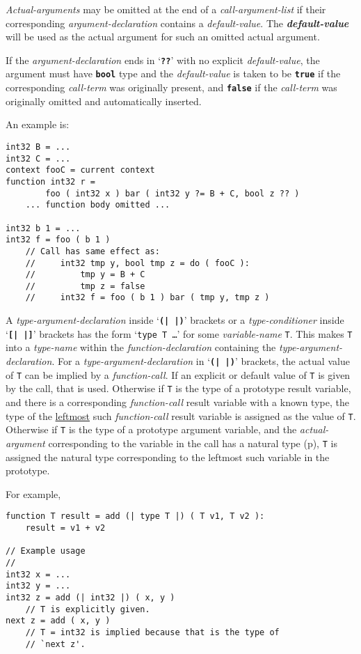 \documentclass[12pt]{article}
\makeatletter
\newcommand{\TT}[1]{{\tt \bfseries #1}}
\newcommand{\emkey}[1]{{\bf \em #1}\index{#1@{\em #1}}}
\newcommand{\pagref}[1]{p\pageref{#1}}
\newenvironment{indpar}[1][0.3in]%
	{\begin{list}{}%
		     {\setlength{\itemsep}{0in}%
		      \setlength{\topsep}{0in}%
		      \setlength{\parsep}{1ex}%
		      \setlength{\labelwidth}{#1}%
		      \setlength{\leftmargin}{#1}%
		      \addtolength{\leftmargin}{\labelsep}}%
	 \item}%
	{\end{list}}
\makeatother
\begin{document}
{\em Actual-arguments} may be omitted at the end of a {\em call-argument-list}
if their corresponding
{\em argu\-ment-declaration} contains a {\em default-value}.
\label{DEFAULT-VALUE}
The \emkey{default-value} will be used as the actual argument
for such an omitted actual argument.

If the {\em argument-declaration} ends in `\TT{??}'\label{BOOL-DEFAULT}
with no explicit {\em default-value}, the
argument must have \TT{bool} type and the
{\em default-value} is taken to be \TT{true} if the
corresponding {\em call-term} was originally present, and \TT{false} if the
{\em call-term} was originally omitted and automatically inserted.

An example is:
\begin{indpar}\begin{verbatim}
int32 B = ...
int32 C = ...
context fooC = current context
function int32 r =
        foo ( int32 x ) bar ( int32 y ?= B + C, bool z ?? )
    ... function body omitted ...

int32 b 1 = ...
int32 f = foo ( b 1 )
    // Call has same effect as:
    //     int32 tmp y, bool tmp z = do ( fooC ):
    //         tmp y = B + C
    //         tmp z = false
    //     int32 f = foo ( b 1 ) bar ( tmp y, tmp z )
\end{verbatim}\end{indpar}

A {\em type-argument-declaration} inside `\TT{(|\,|)}' brackets or
a {\em type-conditioner} inside `\TT{[|\,|]}' brackets has the
form `{\tt type T \ldots}' for some {\em variable-name} {\tt T}.
This makes {\tt T} into a {\em type-name} within the {\em function-declaration}
containing the {\em type-argument-declaration}.
For a {\em type-argument-declaration}
in `\TT{(|\,|)}' brackets,
the actual value of {\tt T} can be implied by a {\em function-call}.
If an explicit or default value of {\tt T} is given by the call, that is used.
Otherwise if {\tt T} is the type of a prototype result variable, and there
is a corresponding {\em function-call} result variable with a known type,
the type of the \underline{leftmost} such {\em function-call} result variable
is assigned as the value of {\tt T}.  Otherwise
if {\tt T} is the type of a prototype argument variable, and
the {\em actual-argument} corresponding to the variable in the call has
a natural type (\pagref{NATURAL-TYPE}), {\tt T} is assigned the natural type
corresponding to the leftmost such variable in the prototype.


For example,
\begin{indpar}\begin{verbatim}
function T result = add (| type T |) ( T v1, T v2 ):
    result = v1 + v2

// Example usage
//
int32 x = ...
int32 y = ...
int32 z = add (| int32 |) ( x, y )
    // T is explicitly given.
next z = add ( x, y )
    // T = int32 is implied because that is the type of
    // `next z'.
\end{verbatim}\end{indpar}
\end{document}
